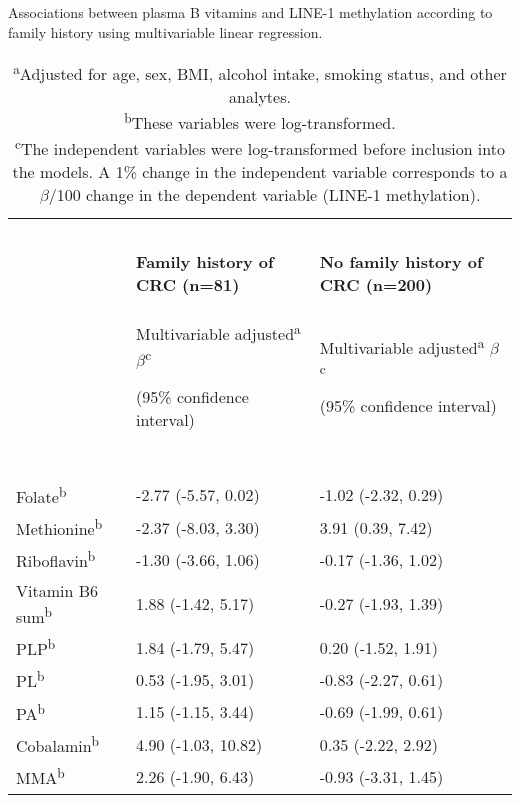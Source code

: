 \begin{table}
\small
\caption{Associations between plasma B vitamins and LINE-1 methylation according to family history using multivariable linear regression.}
\label{table5_3}
\begin{adjustbox}{width=\textwidth}
\begin{tabular}{L{2.5cm}C{5.0cm}C{5.0cm}}

\hline
~ & ~ & ~\\
 ~ & \bfseries Family history of CRC (n=81) & %
\bfseries No family history of CRC (n=200)\\
~ & { Multivariable adjusted\textsuperscript{a}} { $\beta $\textsuperscript{c}}

(95\% confidence interval) & { Multivariable adjusted\textsuperscript{a}} { $\beta $\textsuperscript{c}}

(95\% confidence interval)
\\
~ & ~ & ~\\
\hline
Folate\textsuperscript{b} & -2.77 (-5.57, 0.02) & -1.02 (-2.32, 0.29)\\
Methionine\textsuperscript{b} & -2.37 (-8.03, 3.30) & 3.91 (0.39, 7.42)\\
Riboflavin\textsuperscript{b} & -1.30 (-3.66, 1.06) & -0.17 (-1.36, 1.02)\\
Vitamin B6 sum\textsuperscript{b} & 1.88 (-1.42, 5.17) & -0.27 (-1.93, 1.39)\\
PLP\textsuperscript{b} & 1.84 (-1.79, 5.47) & 0.20 (-1.52, 1.91)\\
PL\textsuperscript{b} & 0.53 (-1.95, 3.01) & -0.83 (-2.27, 0.61)\\
PA\textsuperscript{b} & 1.15 (-1.15, 3.44) & -0.69 (-1.99, 0.61)\\
Cobalamin\textsuperscript{b} & 4.90 (-1.03, 10.82) & 0.35 (-2.22, 2.92)\\
MMA\textsuperscript{b} & 2.26 (-1.90, 6.43) & -0.93 (-3.31, 1.45)\\
\hline
\end{tabular}
\end{adjustbox}
\caption*{\footnotesize{\textsuperscript{a}Adjusted for age, sex, BMI, alcohol intake, smoking status, and other analytes.\\\textsuperscript{b}These variables were log-transformed.\\\textsuperscript{c}The independent variables were log-transformed before inclusion into the models. A 1\% change in the independent variable corresponds to a $\beta$/100 change in the dependent variable (LINE-1 methylation).}}
\end{table}

